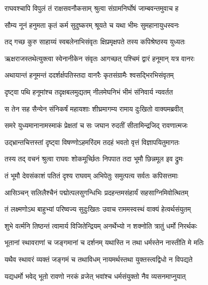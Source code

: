 
\twolineshloka
{राघवश्चापि विपुलं तं राक्षसवनौकसाम्}
{श्रुत्वा संग्रामनिर्घोषं जाम्बवन्तमुवाच ह} %

\twolineshloka
{सौम्य नूनं हनुमता कृतं कर्म सुदुष्करम्}
{श्रूयते च यथा भीमः सुमहानायुधस्वनः} %

\twolineshloka
{तद् गच्छ कुरु साहाय्यं स्वबलेनाभिसंवृतः}
{क्षिप्रमृक्षपते तस्य कपिश्रेष्ठस्य युध्यतः} %

\twolineshloka
{ऋक्षराजस्तथेत्युक्त्वा स्वेनानीकेन संवृतः}
{आगच्छत् पश्चिमं द्वारं हनूमान् यत्र वानरः} %

\twolineshloka
{अथायान्तं हनूमन्तं ददर्शर्क्षपतिस्तदा}
{वानरैः कृतसंग्रामैः श्वसद्भिरभिसंवृतम्} %

\twolineshloka
{दृष्ट्वा पथि हनूमांश्च तदृक्षबलमुद्यतम्}
{नीलमेघनिभं भीमं संनिवार्य न्यवर्तत} %

\twolineshloka
{स तेन सह सैन्येन संनिकर्षं महायशाः}
{शीघ्रमागम्य रामाय दुःखितो वाक्यमब्रवीत्} %

\twolineshloka
{समरे युध्यमानानामस्माकं प्रेक्षतां च सः}
{जघान रुदतीं सीतामिन्द्रजिद् रावणात्मजः} %

\twolineshloka
{उद्भ्रान्तचित्तस्तां दृष्ट्वा विषण्णोऽहमरिंदम}
{तदहं भवतो वृत्तं विज्ञापयितुमागतः} %

\twolineshloka
{तस्य तद् वचनं श्रुत्वा राघवः शोकमूर्च्छितः}
{निपपात तदा भूमौ छिन्नमूल इव द्रुमः} %

\twolineshloka
{तं भूमौ देवसंकाशं पतितं दृश्य राघवम्}
{अभिपेतुः समुत्पत्य सर्वतः कपिसत्तमाः} %

\twolineshloka
{आसिञ्चन् सलिलैश्चैनं पद्मोत्पलसुगन्धिभिः}
{प्रदहन्तमसंहार्यं सहसाग्निमिवोत्थितम्} %

\twolineshloka
{तं लक्ष्मणोऽथ बाहुभ्यां परिष्वज्य सुदुःखितः}
{उवाच राममस्वस्थं वाक्यं हेत्वर्थसंयुतम्} %

\twolineshloka
{शुभे वर्त्मनि तिष्ठन्तं त्वामार्य विजितेन्द्रियम्}
{अनर्थेभ्यो न शक्नोति त्रातुं धर्मो निरर्थकः} %

\twolineshloka
{भूतानां स्थावराणां च जङ्गमानां च दर्शनम्}
{यथास्ति न तथा धर्मस्तेन नास्तीति मे मतिः} %

\twolineshloka
{यथैव स्थावरं व्यक्तं जङ्गमं च तथाविधम्}
{नायमर्थस्तथा युक्तस्त्वद्विधो न विपद्यते} %

\twolineshloka
{यद्यधर्मो भवेद् भूतो रावणो नरकं व्रजेत्}
{भवांश्च धर्मसंयुक्तो नैव व्यसनमाप्नुयात्} %

